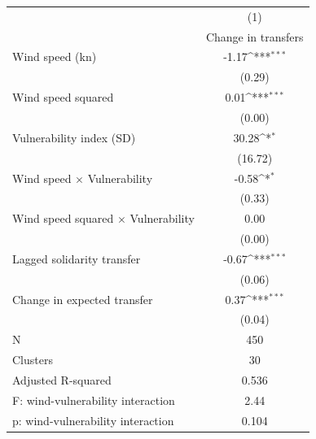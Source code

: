 {
\def\sym#1{\ifmmode^{#1}\else\(^{#1}\)\fi}
\begin{tabular}{l*{1}{c}}
\toprule
            &\multicolumn{1}{c}{(1)}\\
            &\multicolumn{1}{c}{Change in transfers}\\
\midrule
Wind speed (kn)&       -1.17\sym{***}\\
            &      (0.29)         \\
\addlinespace
Wind speed squared&        0.01\sym{***}\\
            &      (0.00)         \\
\addlinespace
Vulnerability index (SD)&       30.28\sym{*}  \\
            &     (16.72)         \\
\addlinespace
Wind speed {\(\times\)} Vulnerability&       -0.58\sym{*}  \\
            &      (0.33)         \\
\addlinespace
Wind speed squared {\(\times\)} Vulnerability&        0.00         \\
            &      (0.00)         \\
\addlinespace
Lagged solidarity transfer&       -0.67\sym{***}\\
            &      (0.06)         \\
\addlinespace
Change in expected transfer&        0.37\sym{***}\\
            &      (0.04)         \\
\midrule
N           &         450         \\
Clusters    &          30         \\
Adjusted R-squared&       0.536         \\
F: wind-vulnerability interaction&        2.44         \\
p: wind-vulnerability interaction&       0.104         \\
\bottomrule
\end{tabular}
}
